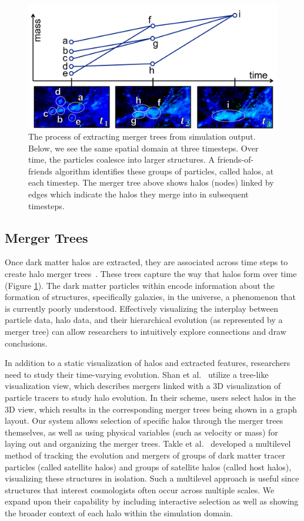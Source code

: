	\begin{figure}[t]
		\includegraphics[width=\textwidth]{images/darkmatter/halo_explanation_4}
		\caption{The process of extracting merger trees from simulation output. Below, we see the same spatial domain at three timesteps. Over time, the particles coalesce into larger structures. A friends-of-friends algorithm identifies these groups of particles, called halos, at each timestep. The merger tree above shows halos (nodes) linked by edges which indicate the halos they merge into in subsequent timesteps.}
		\label{fig:halo_explanation}
	\end{figure}

\subsection{Merger Trees}
Once dark matter halos are extracted, they are associated across time steps to create halo merger trees~\cite{skysurvey}. These trees capture the way that halos form over time (Figure \ref{fig:halo_explanation}). The dark matter particles within encode information about the formation of structures, specifically galaxies, in the universe, a phenomenon that is currently poorly understood. Effectively visualizing the interplay between particle data, halo data, and their hierarchical evolution (as represented by a merger tree) can allow researchers to intuitively explore connections and draw conclusions.

In addition to a static visualization of halos and extracted features, researchers need to study their time-varying evolution. Shan et al.~\cite{Shan:2014} utilize a tree-like visualization view, which describes mergers linked with a 3D visualization of particle tracers to study halo evolution. In their scheme, users select halos in the 3D view, which results in the corresponding merger trees being shown in a graph layout. Our system allows selection of specific halos through the merger trees themselves, as well as using physical variables (such as velocity or mass) for laying out and organizing the merger trees. Takle et al.~\cite{Tackle:2012} developed a multilevel method of tracking the evolution and mergers of groups of dark matter tracer particles (called satellite halos) and groups of satellite halos (called host halos), visualizing these structures in isolation. Such a multilevel approach is useful since structures that interest cosmologists often occur across multiple scales. We expand upon their capability by including interactive selection as well as showing the broader context of each halo within the simulation domain.

